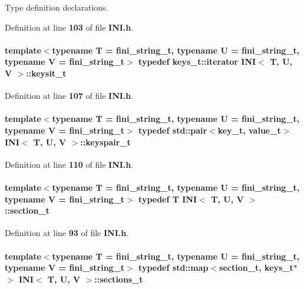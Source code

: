 Type definition declarations. 



Definition at line {\bf 103} of file {\bf I\+N\+I.\+h}.

\paragraph[{keysit\+\_\+t}]{\setlength{\rightskip}{0pt plus 5cm}template$<$typename T  = fini\+\_\+string\+\_\+t, typename U  = fini\+\_\+string\+\_\+t, typename V  = fini\+\_\+string\+\_\+t$>$ typedef keys\+\_\+t\+::iterator {\bf I\+NI}$<$ T, U, V $>$\+::{\bf keysit\+\_\+t}}\label{classINI_ae33c58e217d5ee3fbc8cae737560ce53}


Definition at line {\bf 107} of file {\bf I\+N\+I.\+h}.

\paragraph[{keyspair\+\_\+t}]{\setlength{\rightskip}{0pt plus 5cm}template$<$typename T  = fini\+\_\+string\+\_\+t, typename U  = fini\+\_\+string\+\_\+t, typename V  = fini\+\_\+string\+\_\+t$>$ typedef std\+::pair$<${\bf key\+\_\+t}, {\bf value\+\_\+t}$>$ {\bf I\+NI}$<$ T, U, V $>$\+::{\bf keyspair\+\_\+t}}\label{classINI_a74debe5259e76d734b5376c99b0ba1c8}


Definition at line {\bf 110} of file {\bf I\+N\+I.\+h}.

\paragraph[{section\+\_\+t}]{\setlength{\rightskip}{0pt plus 5cm}template$<$typename T  = fini\+\_\+string\+\_\+t, typename U  = fini\+\_\+string\+\_\+t, typename V  = fini\+\_\+string\+\_\+t$>$ typedef T {\bf I\+NI}$<$ T, U, V $>$\+::{\bf section\+\_\+t}}\label{classINI_a82551bff97cdd5c7ff183b24bd9b2188}


Definition at line {\bf 93} of file {\bf I\+N\+I.\+h}.

\paragraph[{sections\+\_\+t}]{\setlength{\rightskip}{0pt plus 5cm}template$<$typename T  = fini\+\_\+string\+\_\+t, typename U  = fini\+\_\+string\+\_\+t, typename V  = fini\+\_\+string\+\_\+t$>$ typedef std\+::map$<${\bf section\+\_\+t}, {\bf keys\+\_\+t}$\ast$$>$ {\bf I\+NI}$<$ T, U, V $>$\+::{\bf sections\+\_\+t}}\label{classINI_ab5fa6745b8a64763b20964a254469aa2}


